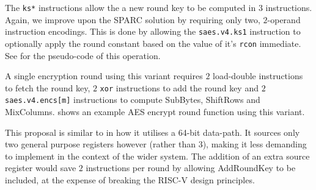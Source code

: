The {\tt ks*} instructions allow the a new round key to be computed
in $3$ instructions.
Again, we improve upon the SPARC solution by requiring only two,
$2$-operand instruction encodings.
This is done by allowing the {\tt saes.v4.ks1} instruction
to optionally apply the round constant based on the value of
it's {\tt rcon} immediate.
See  for the pseudo-code of this
operation.

A single encryption round using this variant requires
$2$ load-double instructions to fetch the round key,
$2$ {\tt xor} instructions to add the round key
and
$2$ {\tt saes.v4.encs[m]} instructions to compute SubBytes, ShiftRows
and MixColumns.
 shows an example AES encrypt round function
using this variant.

This proposal is similar to \cite{SPARC:16} in how it utilises
a 64-bit data-path.
It sources only two general purpose registers however (rather than $3$),
making it less demanding to implement in the context of the wider
system.
The addition of an extra source register would save $2$ instructions
per round by allowing AddRoundKey to be included, at the expense
of breaking the RISC-V design principles.

